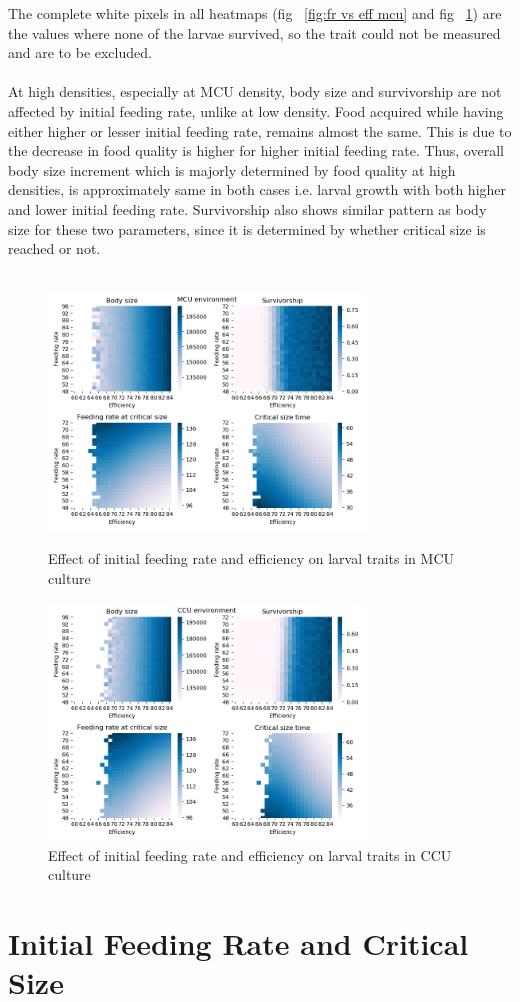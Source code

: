 The complete white pixels in all heatmaps (fig ~\ref{fig:fr vs eff mcu} and fig ~\ref{fig:fr vs eff ccu}) are the values where none of the larvae survived, so the trait could not be measured and are to be excluded.
\\ \\
At high densities, especially at MCU density, body size and survivorship are not affected by initial feeding rate, unlike at low density. Food acquired while having either higher or lesser initial feeding rate, remains almost the same. This is due to the decrease in food quality is higher for higher initial feeding rate. Thus, overall body size increment which is majorly determined by food quality at high densities, is approximately same in both cases i.e. larval growth with both higher and lower initial feeding rate. Survivorship also shows similar pattern as body size for these two parameters, since it is determined by whether critical size is reached or not.\\ \\
\begin{figure}[!tbp]
  \centering
  \includegraphics[width=0.75\textwidth]{C3/Figs/Feeding rate_vs_Efficiency_MCU}
  \caption{Effect of initial feeding rate and efficiency on larval traits in MCU culture}
  \label{fig:fr vs eff mcu}
  \vspace{24pt}
  \includegraphics[width=0.75\textwidth]{C3/Figs/Feeding rate_vs_Efficiency_CCU}
  \caption{Effect of initial feeding rate and efficiency on larval traits in CCU culture}
  \label{fig:fr vs eff ccu}
\end{figure}
\newpage

\section{Initial Feeding Rate and Critical Size}
\pagebreak


